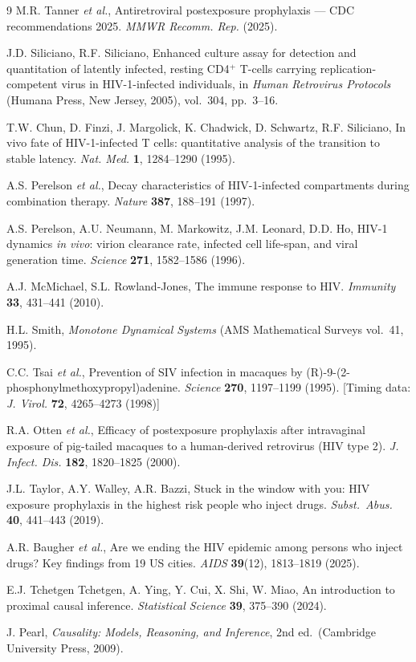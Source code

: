 \documentclass[11pt]{article}
\theoremstyle{definition}
\theoremstyle{remark}
\begin{document}
\begin{thebibliography}{9}
M.R. Tanner \textit{et al.}, Antiretroviral postexposure prophylaxis --- CDC recommendations 2025. \textit{MMWR Recomm. Rep.} (2025).

J.D. Siliciano, R.F. Siliciano, Enhanced culture assay for detection and quantitation of latently infected, resting CD4$^{+}$ T-cells carrying replication-competent virus in HIV-1-infected individuals, in \textit{Human Retrovirus Protocols} (Humana Press, New Jersey, 2005), vol.~304, pp.~3--16.

T.W. Chun, D. Finzi, J. Margolick, K. Chadwick, D. Schwartz, R.F. Siliciano, In vivo fate of HIV-1-infected T cells: quantitative analysis of the transition to stable latency. \textit{Nat. Med.} \textbf{1}, 1284--1290 (1995).

A.S. Perelson \textit{et al.}, Decay characteristics of HIV-1-infected compartments during combination therapy. \textit{Nature} \textbf{387}, 188--191 (1997).

A.S. Perelson, A.U. Neumann, M. Markowitz, J.M. Leonard, D.D. Ho, HIV-1 dynamics \textit{in vivo}: virion clearance rate, infected cell life-span, and viral generation time. \textit{Science} \textbf{271}, 1582--1586 (1996).

A.J. McMichael, S.L. Rowland-Jones, The immune response to HIV. \textit{Immunity} \textbf{33}, 431--441 (2010).

H.L. Smith, \textit{Monotone Dynamical Systems} (AMS Mathematical Surveys vol.~41, 1995).

C.C. Tsai \textit{et al.}, Prevention of SIV infection in macaques by (R)-9-(2-phosphonylmethoxypropyl)adenine. \textit{Science} \textbf{270}, 1197--1199 (1995). [Timing data: \textit{J. Virol.} \textbf{72}, 4265--4273 (1998)]

R.A. Otten \textit{et al.}, Efficacy of postexposure prophylaxis after intravaginal exposure of pig-tailed macaques to a human-derived retrovirus (HIV type 2). \textit{J. Infect. Dis.} \textbf{182}, 1820--1825 (2000).

J.L. Taylor, A.Y. Walley, A.R. Bazzi, Stuck in the window with you: HIV exposure prophylaxis in the highest risk people who inject drugs. \textit{Subst.\ Abus.} \textbf{40}, 441--443 (2019).

A.R. Baugher \textit{et al.}, Are we ending the HIV epidemic among persons who inject drugs? Key findings from 19 US cities. \textit{AIDS} \textbf{39}(12), 1813--1819 (2025).

E.J. Tchetgen Tchetgen, A. Ying, Y. Cui, X. Shi, W. Miao, An introduction to proximal causal inference. \textit{Statistical Science} \textbf{39}, 375--390 (2024).

J. Pearl, \textit{Causality: Models, Reasoning, and Inference}, 2nd ed.\ (Cambridge University Press, 2009).
\end{thebibliography}
\end{document}
